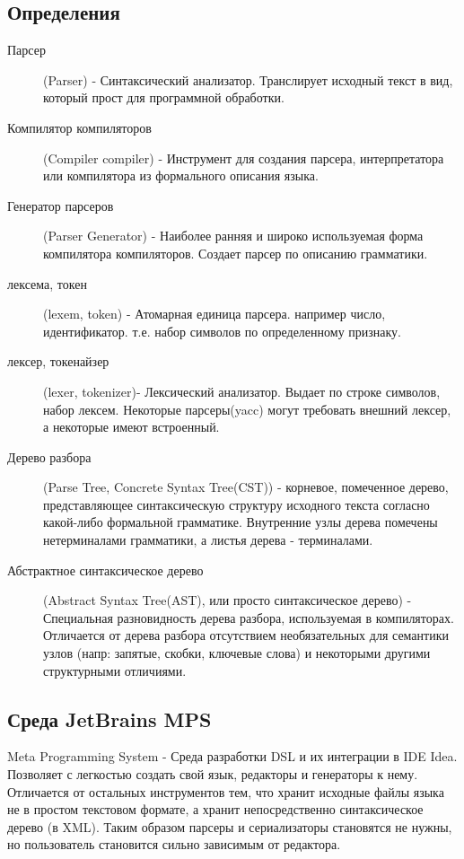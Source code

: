 \documentclass[a4paper,12pt]{article}
\begin{document}
\subsection{Определения}
\begin{description}
  \item[Парсер] (Parser) -
    Синтаксический анализатор. Транслирует исходный текст в вид, который прост
    для программной обработки.
  \item[Компилятор компиляторов] (Compiler compiler) -
	Инструмент для создания парсера, интерпретатора или компилятора из формального
	описания языка.
  \item[Генератор парсеров] (Parser Generator) -
  	Наиболее ранняя и широко используемая форма компилятора компиляторов.
  	Создает парсер по описанию грамматики. 
  \item[лексема, токен] (lexem, token) - 
  	Атомарная единица парсера. например число, идентификатор. т.е. набор
  	символов по определенному признаку.
  \item[лексер, токенайзер] (lexer, tokenizer)-
  	Лексический анализатор. Выдает по строке символов, набор лексем. Некоторые
  	парсеры(yacc) могут требовать внешний лексер, а некоторые имеют встроенный.
  \item[Дерево разбора] (Parse Tree, Concrete Syntax Tree(CST)) -
  	корневое, помеченное дерево, представляющее синтаксическую структуру
  	исходного текста согласно какой-либо формальной грамматике. Внутренние узлы
  	дерева помечены нетерминалами грамматики, а листья дерева - терминалами.
  \item[Абстрактное синтаксическое дерево] (Abstract Syntax Tree(AST), или
  просто синтаксическое дерево) - Специальная разновидность дерева разбора,
  используемая в компиляторах. Отличается от дерева разбора отсутствием
  необязательных для семантики узлов (напр: запятые, скобки, ключевые слова) и
  некоторыми другими структурными отличиями.
\end{description}

\subsection{Среда JetBrains MPS}
Meta Programming System - Среда разработки DSL и их интеграции в IDE Idea.
Позволяет с легкостью создать свой язык, редакторы и генераторы к нему.
Отличается от остальных инструментов тем, что хранит исходные файлы языка не в
простом текстовом формате, а хранит непосредственно синтаксическое дерево (в
XML). Таким образом парсеры и сериализаторы становятся не нужны, но
пользователь становится сильно зависимым от редактора.
\end{document}
